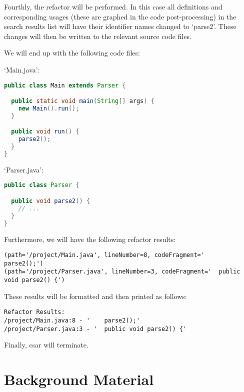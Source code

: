 \documentclass[12pt, letterpaper, oneside]{article}
\begin{document}
Fourthly, the refactor will be performed. In this case all definitions and corresponding usages (these are graphed in the code post-processing) in the search results list will have their identifier names changed to `parse2'.
These changes will then be written to the relevant source code files.

We will end up with the following code files:

`Main.java':
\begin{lstlisting}[language=Java]
public class Main extends Parser {

  public static void main(String[] args) {
    new Main().run();
  }

  public void run() {
    parse2();
  }
}
\end{lstlisting}

`Parser.java':
\begin{lstlisting}[language=Java]
public class Parser {

  public void parse2() {
    // ...
  }
}
\end{lstlisting}

Furthermore, we will have the following refactor results:
\begin{lstlisting}
(path='/project/Main.java', lineNumber=8, codeFragment='    parse2();')
(path='/project/Parser.java', lineNumber=3, codeFragment='  public void parse2() {')
\end{lstlisting}

These results will be formatted and then printed as follows:
\begin{lstlisting}
Refactor Results:
/project/Main.java:8 - '    parse2();'
/project/Parser.java:3 - '  public void parse2() {'
\end{lstlisting}

Finally, csar will terminate.

\section{Background Material}
\end{document}
